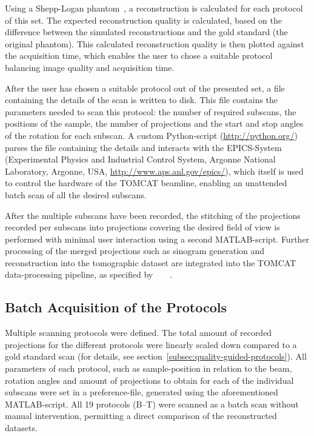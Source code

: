 Using a Shepp-Logan phantom~\cite{Shepp1974}, a reconstruction is calculated for each protocol of this set. The expected reconstruction quality is calculated, based on the difference between the simulated reconstructions and the gold standard (the original phantom). This calculated reconstruction quality is then plotted against the acquisition time, which enables the user to chose a suitable protocol balancing image quality and acquisition time.

After the user has chosen a suitable protocol out of the presented set, a file containing the details of the scan is written to disk. This file contains the parameters needed to scan this protocol: the number of required subscans, the positions of the sample, the number of projections and the start and stop angles of the rotation for each subscan. A custom Python-script (\url{http://python.org/}) parses the file containing the details and interacts with the EPICS-System (Experimental Physics and Industrial Control System, Argonne National Laboratory, Argonne, USA, \url{http://www.aps.anl.gov/epics/}), which itself is used to control the hardware of the TOMCAT beamline, enabling an unattended batch scan of all the desired subscans.

After the multiple subscans have been recorded, the stitching of the projections recorded per subscans into projections covering the desired field of view is performed with minimal user interaction using a second MATLAB-script. Further processing of the merged projections such as sinogram generation and reconstruction into the tomographic dataset are integrated into the TOMCAT data-processing pipeline, as specified by%
\ifhtml%
	~\citet{Hintermueller2009}%
\else%
	~%
\fi%
.

\subsection{Batch Acquisition of the Protocols}%
Multiple scanning protocols were defined. The total amount of recorded projections for the different protocols were linearly scaled down compared to a gold standard scan (for details, see section~\ref{subsec:quality-guided-protocols}). All parameters of each protocol, such as sample-position in relation to the beam, rotation angles and amount of projections to obtain for each of the individual subscans were set in a preference-file, generated using the aforementioned MATLAB-script. All 19 protocols (B--T) were scanned as a batch scan without manual intervention, permitting a direct comparison of the reconstructed datasets.

